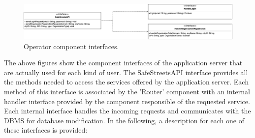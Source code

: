 \begin{figure}[H]
	\centering
	\includegraphics[width=\linewidth]{Images/OperatorComponentInterfaces}
	\caption{Operator component interfaces.}
\end{figure}
The above figures show the component interfaces of the application server that are actually used for each kind of user. The SafeStreetsAPI interface provides all the methods needed to access the services offered by the application server. Each method of this interface is associated by the 'Router' component with an internal handler interface provided by the component responsible of the requested service. Each internal interface handles the incoming requests and communicates with the DBMS for database modification. In the following, a description for each one of these interfaces is provided:
